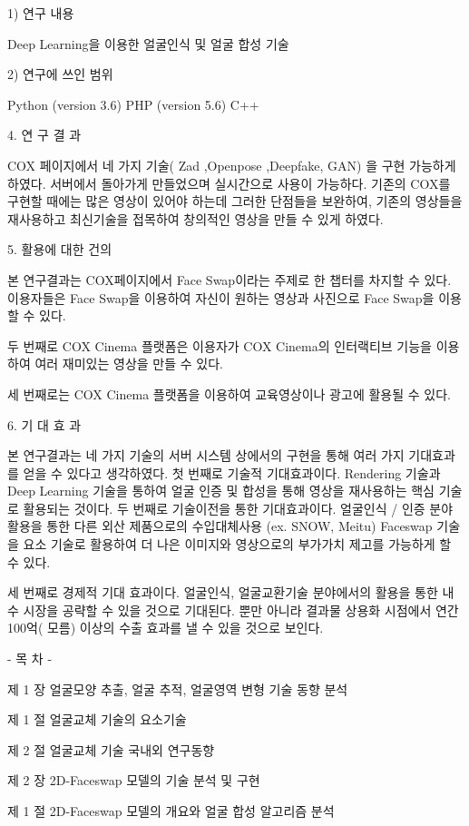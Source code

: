 1) 연구 
내용

Deep Learning을 이용한 얼굴인식 및 얼굴 합성 기술

2) 연구에 쓰인 범위

Python (version 3.6) 
PHP (version 5.6) 
C++

4. 연  구  결  과

COX 페이지에서 네 가지 기술( Zad ,Openpose ,Deepfake, GAN) 을 구현 가능하게 하였다. 서버에서 돌아가게 만들었으며 실시간으로 사용이 가능하다. 기존의 COX를 구현할 때에는 많은 영상이 있어야 하는데 그러한 단점들을 보완하여, 기존의 영상들을 재사용하고 최신기술을 접목하여 창의적인 영상을 만들 수 있게 하였다.


5. 활용에 대한 건의

본 연구결과는 COX페이지에서 Face Swap이라는 주제로 한 챕터를 차지할 수 있다. 이용자들은 Face Swap을 이용하여 자신이 원하는 영상과 사진으로 Face Swap을 이용할 수 있다.

두 번째로 COX Cinema 플랫폼은 이용자가 COX Cinema의 인터랙티브 기능을 이용하여 여러 재미있는 영상을 만들 수 있다. 

세 번째로는 COX Cinema 플랫폼을 이용하여 교육영상이나 광고에 활용될 수 있다.


6. 기  대  효  과

본 연구결과는 네 가지 기술의 서버 시스템 상에서의 구현을 통해 여러 가지 기대효과를 얻을 수 있다고 생각하였다. 첫 번째로 기술적 기대효과이다. Rendering 기술과 Deep Learning 기술을 통하여 얼굴 인증 및 합성을 통해 영상을 재사용하는 핵심 기술로 활용되는 것이다.
두 번째로 기술이전을 통한 기대효과이다. 얼굴인식 / 인증 분야 활용을 통한 다른 외산 제품으로의 수입대체사용 (ex. SNOW, Meitu) Faceswap 기술을 요소 기술로 활용하여 더 나은 이미지와 영상으로의 부가가치 제고를 가능하게 할 수 있다.

세 번째로 경제적 기대 효과이다. 얼굴인식, 얼굴교환기술 분야에서의 활용을 통한 내수 시장을 공략할 수 있을 것으로 기대된다. 뿐만 아니라 결과물 상용화 시점에서 연간 100억(
모름) 이상의 수출 효과를 낼 수 있을 것으로 보인다.


-   목     차   -

제  1  장 얼굴모양 추출, 얼굴 추적, 얼굴영역 변형 기술 동향 분석

제  1  절 얼굴교체 기술의 요소기술

제  2  절 얼굴교체 기술 국내외 연구동향

제  2  장 2D-Faceswap 모델의 기술 분석 및 구현

제  1  절 2D-Faceswap 모델의 개요와 얼굴 합성 알고리즘 분석

